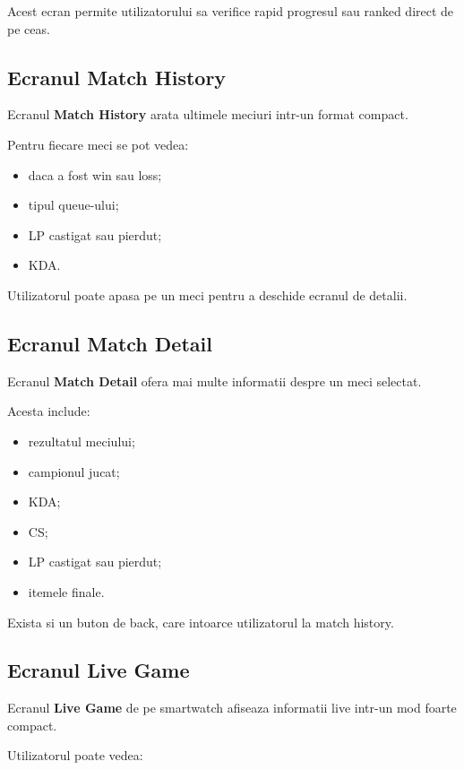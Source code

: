 \documentclass[12pt,a4paper]{article}
\begin{document}
Acest ecran permite utilizatorului sa verifice rapid progresul sau ranked direct de pe ceas.

\subsection{Ecranul Match History}

Ecranul \textbf{Match History} arata ultimele meciuri intr-un format compact.

Pentru fiecare meci se pot vedea:

\begin{itemize}
    \item daca a fost win sau loss;
    \item tipul queue-ului;
    \item LP castigat sau pierdut;
    \item KDA.
\end{itemize}

Utilizatorul poate apasa pe un meci pentru a deschide ecranul de detalii.

\subsection{Ecranul Match Detail}

Ecranul \textbf{Match Detail} ofera mai multe informatii despre un meci selectat.

Acesta include:

\begin{itemize}
    \item rezultatul meciului;
    \item campionul jucat;
    \item KDA;
    \item CS;
    \item LP castigat sau pierdut;
    \item itemele finale.
\end{itemize}

Exista si un buton de back, care intoarce utilizatorul la match history.

\subsection{Ecranul Live Game}

Ecranul \textbf{Live Game} de pe smartwatch afiseaza informatii live intr-un mod foarte compact.

Utilizatorul poate vedea:
\end{document}
